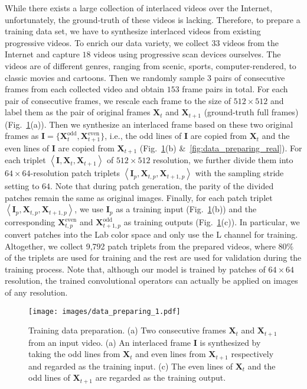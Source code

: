 \documentclass[acmtog]{acmart}
\begin{document}
While there exists a large collection of interlaced videos over the Internet,
unfortunately, the ground-truth of these videos is lacking. Therefore, to
prepare a training data set, we have to synthesize
interlaced videos from existing progressive videos. To enrich our data variety, we
collect $33$ videos from the Internet and capture $18$ videos using progressive
scan devices ourselves. The videos are of different genres, ranging from 
scenic, sports, computer-rendered, to classic movies and cartoons. Then we randomly sample $3$ pairs of consecutive frames from each collected
video and obtain $153$ frame pairs in total. For each pair of consecutive
frames, we rescale each frame to the size of $512\times512$ and label them as the
pair of original frames $\mathbf{X}_t$ and $\mathbf{X}_{t+1}$ (ground-truth full frames)
(Fig.~\ref{fig:data_preparing}(a)). Then we synthesize an interlaced frame based
on these two original frames as
$\mathbf{I}=\{\mathbf{X}^{\text{odd}}_t,\mathbf{X}^{\text{even}}_{t+1}\}$, i.e.,
the odd lines of $\mathbf{I}$ are copied from $\mathbf{X}_t$ and the even lines
of $\mathbf{I}$ are copied from $\mathbf{X}_{t+1}$
(Fig.~\ref{fig:data_preparing}(b) \&~\ref{fig:data_preparing_real}). For
each triplet $\left\langle \mathbf{I}, \mathbf{X}_t,
\mathbf{X}_{t+1}\right\rangle $ of $512\times512$ resolution, we further divide
them into $64\times64$-resolution patch triplets $\left\langle \mathbf{I}_{p},
\mathbf{X}_{t,p}, \mathbf{X}_{t+1,p}\right\rangle$ with the sampling stride
setting to $64$.  Note that during patch generation, the parity of the divided
patches remain the same as original images. Finally, for each patch triplet
$\left\langle \mathbf{I}_{p}, \mathbf{X}_{t,p}, \mathbf{X}_{t+1,p}\right\rangle
$, we use $\mathbf{I}_{p}$ as a training input
(Fig.~\ref{fig:data_preparing}(b)) and the corresponding
$\mathbf{X}^{\text{even}}_{t,p}$ and $\mathbf{X}^{\text{odd}}_{t+1,p}$ as
training outputs (Fig.~\ref{fig:data_preparing}(c)). In particular, we convert
patches into the Lab color space and only use the L channel for training. Altogether, we
collect 9,792 patch triplets from the prepared videos, where $80\%$ of
the triplets are used for training and the rest are used for validation during
the training process. Note that, although our model is trained by patches of
$64\times64$ resolution, the trained convolutional operators can actually be
applied on images of any resolution.

\begin{figure}[!tp]
\texttt{[image: images/data\_preparing\_1.pdf]}\\
	\caption{Training data preparation. (a) Two consecutive frames $\mathbf{X}_t$ and $\mathbf{X}_{t+1}$ from an input video. (a) An interlaced frame $\mathbf{I}$ is synthesized by taking the odd lines from $\mathbf{X}_t$ and even lines from $\mathbf{X}_{t+1}$ respectively and regarded as the training input. (c) The even lines of $\mathbf{X}_t$ and the odd lines of $\mathbf{X}_{t+1}$ are regarded as the training output.}\label{fig:data_preparing}
\end{figure}
\end{document}
